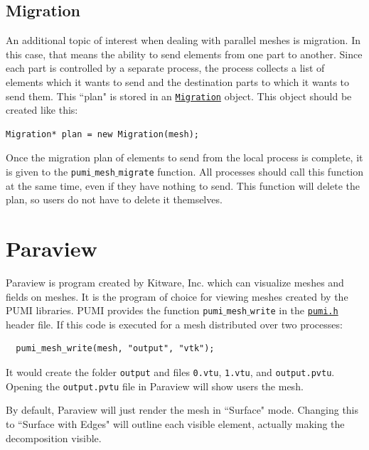\documentclass{article}
\begin{document}


\subsection{Migration}

An additional topic of interest when dealing with parallel
meshes is migration.
In this case, that means the ability to send elements
from one part to another.
Since each part is controlled by a separate process,
the process collects a list of elements which it
wants to send and the destination parts to which
it wants to send them.
This ``plan" is stored in an
\href{http://scorec.rpi.edu/~dibanez/core/classapf_1_1Migration.html}{\texttt{Migration}}
object.
This object should be created like this:

\begin{lstlisting}
Migration* plan = new Migration(mesh);
\end{lstlisting}

Once the migration plan of elements to send from
the local process is complete, it is given to the
\texttt{pumi$\_$mesh$\_$migrate} function.
All processes should call this function at the
same time, even if they have nothing to send.
This function will delete the plan, so users
do not have to delete it themselves.

\appendix

\section{Paraview}
\label{sec:paraview}

Paraview is program created by Kitware, Inc. which can visualize meshes
and fields on meshes.
It is the program of choice for viewing meshes created by the PUMI libraries.
PUMI provides the function \texttt{pumi$\_$mesh$\_$write}
in the \href{https://github.com/SCOREC/core/blob/master/pumi/pumi.h}
{\texttt{pumi.h}} header file.
If this code is executed for a mesh distributed over two processes:

\begin{lstlisting}
  pumi_mesh_write(mesh, "output", "vtk");
\end{lstlisting}

It would create the folder \texttt{output} and files \texttt{0.vtu}, \texttt{1.vtu},
and \texttt{output.pvtu}.
Opening the \texttt{output.pvtu} file in Paraview will show users the
mesh.

By default, Paraview will just render the mesh in ``Surface" mode.
Changing this to ``Surface with Edges" will outline each visible element,
actually making the decomposition visible.
\end{document}
